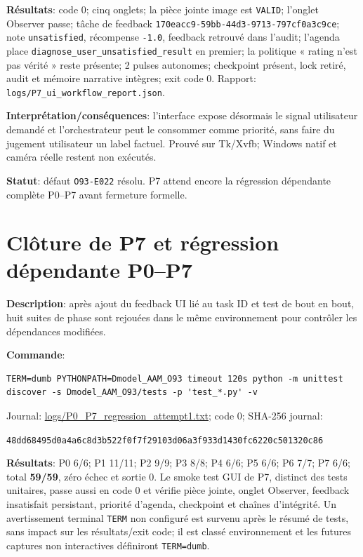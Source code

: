\documentclass[11pt,a4paper,oneside]{report}
\begin{document}
\textbf{Résultats}: code 0; cinq onglets; la pièce jointe image est \texttt{VALID}; l’onglet Observer passe; tâche de feedback \texttt{170eacc9-59bb-44d3-9713-797cf0a3c9ce}; note \texttt{unsatisfied}, récompense \texttt{-1.0}, feedback retrouvé dans l’audit; l’agenda place \texttt{diagnose\_user\_unsatisfied\_result} en premier; la politique « rating n’est pas vérité » reste présente; 2 pulses autonomes; checkpoint présent, lock retiré, audit et mémoire narrative intègres; exit code 0. Rapport: \texttt{logs/P7\_ui\_workflow\_report.json}.

\textbf{Interprétation/conséquences}: l’interface expose désormais le signal utilisateur demandé et l’orchestrateur peut le consommer comme priorité, sans faire du jugement utilisateur un label factuel. Prouvé sur Tk/Xvfb; Windows natif et caméra réelle restent non exécutés.

\textbf{Statut}: défaut \texttt{O93-E022} résolu. P7 attend encore la régression dépendante complète P0--P7 avant fermeture formelle.


\section{Clôture de P7 et régression dépendante P0--P7}
\textbf{Description}: après ajout du feedback UI lié au task ID et test de bout en bout, huit suites de phase sont rejouées dans le même environnement pour contrôler les dépendances modifiées.

\textbf{Commande}:
\begin{lstlisting}[basicstyle=\ttfamily\small,breaklines=true]
TERM=dumb PYTHONPATH=Dmodel_AAM_O93 timeout 120s python -m unittest discover -s Dmodel_AAM_O93/tests -p 'test_*.py' -v
\end{lstlisting}
Journal: \url{logs/P0_P7_regression_attempt1.txt}; code 0; SHA-256 journal:
\begin{center}\small
\texttt{48dd6849}\allowbreak\texttt{5d0a4a6c}\allowbreak\texttt{8d3b522f}\allowbreak\texttt{0f7f2910}\allowbreak\texttt{3d06a3f9}\allowbreak\texttt{33d1430f}\allowbreak\texttt{c6220c50}\allowbreak\texttt{1320c86}
\end{center}

\textbf{Résultats}: P0 6/6; P1 11/11; P2 9/9; P3 8/8; P4 6/6; P5 6/6; P6 7/7; P7 6/6; total \textbf{59/59}, zéro échec et sortie 0. Le smoke test GUI de P7, distinct des tests unitaires, passe aussi en code 0 et vérifie pièce jointe, onglet Observer, feedback insatisfait persistant, priorité d’agenda, checkpoint et chaînes d’intégrité. Un avertissement terminal \texttt{TERM} non configuré est survenu après le résumé de tests, sans impact sur les résultats/exit code; il est classé environnement et les futures captures non interactives définiront \texttt{TERM=dumb}.
\end{document}
